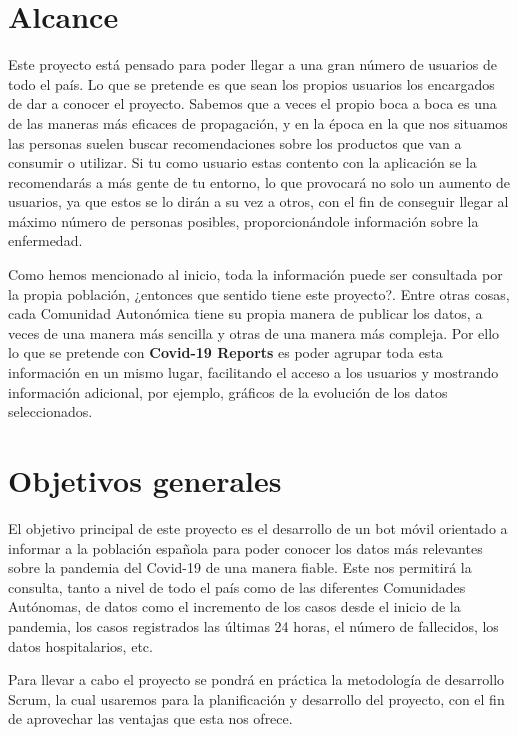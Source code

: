 \section{Alcance}

Este proyecto está pensado para poder llegar a una gran número de usuarios de todo el país. Lo que se pretende es que sean los propios usuarios los encargados de dar a conocer el proyecto. Sabemos que a veces el propio boca a boca es una de las maneras más eficaces de propagación, y en la época en la que nos situamos las personas suelen buscar recomendaciones sobre los productos que van a consumir o utilizar. Si tu como usuario estas contento con la aplicación se la recomendarás a más gente de tu entorno, lo que provocará no solo un aumento de usuarios, ya que estos se lo dirán a su vez a otros, con el fin de conseguir llegar al máximo número de personas posibles, proporcionándole información sobre la enfermedad.

Como hemos mencionado al inicio, toda la información puede ser consultada por la propia población, ¿entonces que sentido tiene este proyecto?. Entre otras cosas, cada Comunidad Autonómica tiene su propia manera de publicar los datos, a veces de una manera más sencilla y otras de una manera más compleja. Por ello lo que se pretende con \textbf{Covid-19 Reports} es poder agrupar toda esta información en un mismo lugar, facilitando el acceso a los usuarios y mostrando información adicional, por ejemplo, gráficos de la evolución de los datos seleccionados.

\section{Objetivos generales}

El objetivo principal de este proyecto es el desarrollo de un bot móvil orientado a informar a la población española para poder conocer los datos más relevantes sobre la pandemia del Covid-19 de una manera fiable. Este nos permitirá la consulta, tanto a nivel de todo el país como de las diferentes Comunidades Autónomas, de datos como el incremento de los casos desde el inicio de la pandemia, los casos registrados las últimas 24 horas, el número de fallecidos, los datos hospitalarios, etc.

Para llevar a cabo el proyecto se pondrá en práctica la metodología de desarrollo Scrum, la cual usaremos para la planificación y desarrollo del proyecto, con el fin de aprovechar las ventajas que esta nos ofrece.

